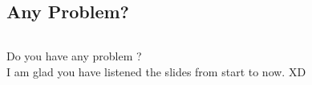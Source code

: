 \documentclass[t,compress, hyperref={colorlinks,linkcolor=white,urlcolor=DarkBlue}]{beamer}
\begin{document}
\subsection{Any Problem?}
\begin{frame}
    \begin{columns}[t]
        \begin{column}{\textwidth}
            \begin{center}
                {\Huge Do you have any problem ?}\\
                I am glad you have listened the slides from start to now. XD
            \end{center}
        \end{column}
    \end{columns}
\end{frame}
\end{document}

